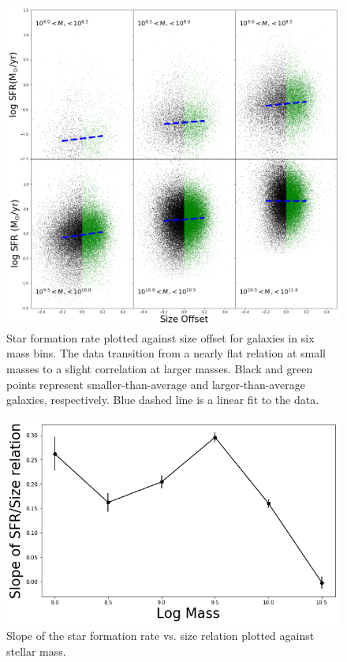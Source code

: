 \documentclass[iop]{emulateapj}
\begin{document}
\begin{figure}
	\centering
	\includegraphics[width=1.5 \columnwidth]{ha_lum_2x2_2A.png}
	\caption{Star formation rate plotted against size offset for galaxies in six mass bins. The data transition from a nearly flat relation at small masses to a slight correlation at larger masses. Black and green points represent smaller-than-average and larger-than-average galaxies, respectively. Blue dashed line is a linear fit to the data.}
     \label{fig:sfr}

\end{figure}

\begin{figure}
	\centering
	\includegraphics[width= \columnwidth]{slope_sfr_size.png}
	\caption{Slope of the star formation rate vs. size relation plotted against stellar mass.}
	\label{fig:HA_lum_mass}
	
\end{figure}
\end{document}
